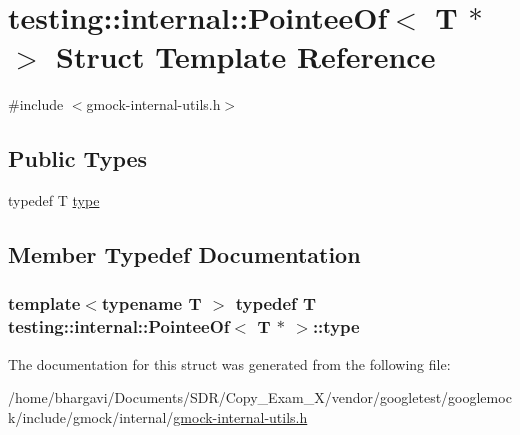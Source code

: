\hypertarget{structtesting_1_1internal_1_1_pointee_of_3_01_t_01_5_01_4}{}\section{testing\+:\+:internal\+:\+:Pointee\+Of$<$ T $\ast$ $>$ Struct Template Reference}
\label{structtesting_1_1internal_1_1_pointee_of_3_01_t_01_5_01_4}


{\ttfamily \#include $<$gmock-\/internal-\/utils.\+h$>$}

\subsection*{Public Types}
\begin{DoxyCompactItemize}
\item 
typedef T \hyperlink{structtesting_1_1internal_1_1_pointee_of_3_01_t_01_5_01_4_a91dde514cd3a8c07cedbe5336c36a55f}{type}
\end{DoxyCompactItemize}


\subsection{Member Typedef Documentation}
\subsubsection[{\texorpdfstring{type}{type}}]{\setlength{\rightskip}{0pt plus 5cm}template$<$typename T $>$ typedef T {\bf testing\+::internal\+::\+Pointee\+Of}$<$ T $\ast$ $>$\+::{\bf type}}\hypertarget{structtesting_1_1internal_1_1_pointee_of_3_01_t_01_5_01_4_a91dde514cd3a8c07cedbe5336c36a55f}{}\label{structtesting_1_1internal_1_1_pointee_of_3_01_t_01_5_01_4_a91dde514cd3a8c07cedbe5336c36a55f}


The documentation for this struct was generated from the following file\+:\begin{DoxyCompactItemize}
\item 
/home/bhargavi/\+Documents/\+S\+D\+R/\+Copy\+\_\+\+Exam\+\_\+X/vendor/googletest/googlemock/include/gmock/internal/\hyperlink{gmock-internal-utils_8h}{gmock-\/internal-\/utils.\+h}\end{DoxyCompactItemize}

